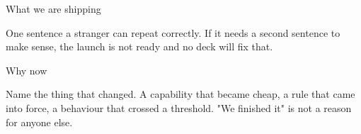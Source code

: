 \begin{frame}{What we are shipping}
  \begin{glass}
  One sentence a stranger can repeat correctly. If it needs a second sentence to make sense,
  the launch is not ready and no deck will fix that.
  \end{glass}
\end{frame}

\begin{frame}{Why now}
  \begin{glass}
  Name the thing that changed. A capability that became cheap, a rule that came into force,
  a behaviour that crossed a threshold. "We finished it" is not a reason for anyone else.
  \end{glass}
\end{frame}
